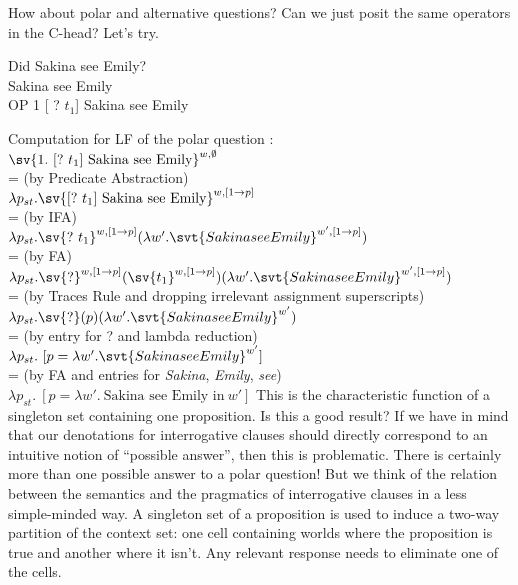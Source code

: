 How about polar and alternative questions? Can we just posit the same operators
in the C-head? Let's try.

%
\ex Did Sakina see Emily?\\
\null[$_{C}$ ? OP] Sakina see Emily\\
OP 1 [ ? $t_{1}$] Sakina see Emily \xe

\ex Computation for LF of the polar question \Last:\\
$\sv{1.\ [?\ t_{1}]\ \text{Sakina see Emily}}^{{w,\emptyset}}$\\
{\small = (by Predicate Abstraction)}\\
$\lambda p_{st}. \sv{[?\ t_{1}]\ \text{Sakina see
    Emily}}^{w,[1\rightarrow p]}$\\
{\small = (by IFA)}\\
$\lambda p_{st}. \sv{?\ t_{1}}^{w,[1\rightarrow p]}(\lambda w'. \svt{Sakina see Emily}^{w',[1\rightarrow p]})$\\
{\small = (by FA)}\\
$\lambda p_{st}. \sv{?}^{w,[1\rightarrow p]}(\sv{t_{1}}^{w,[1\rightarrow p]})(\lambda w'. \svt{Sakina see Emily}^{w',[1\rightarrow p]})$\\
{\small = (by Traces Rule and dropping irrelevant assignment superscripts)}\\
$\lambda p_{st}. \sv{?}(p)(\lambda w'. \svt{Sakina see Emily}^{w'})$\\
{\small = (by entry for ? and lambda reduction)}\\
$\lambda p_{st}.\ [p = \lambda w'. \svt{Sakina see Emily}^{w'}]$\\
{\small = (by FA and entries for \emph{Sakina}, \emph{Emily}, \emph{see})}\\
$\lambda p_{st}.\ [p = \lambda w'.\ \text{Sakina see Emily in}\ w']$
\xe
%
This is the characteristic function of a singleton set containing one
proposition. Is this a good result? If we have in mind that our denotations for
interrogative clauses should directly correspond to an intuitive notion of
``possible answer'', then this is problematic. There is certainly more than one
possible answer to a polar question! But we think of the relation
between the semantics and the pragmatics of interrogative clauses in a less
simple-minded way. A singleton set of a proposition is used to induce a two-way
partition of the context set: one cell containing worlds where the proposition
is true and another where it isn't. Any relevant response needs to eliminate one
of the cells.


